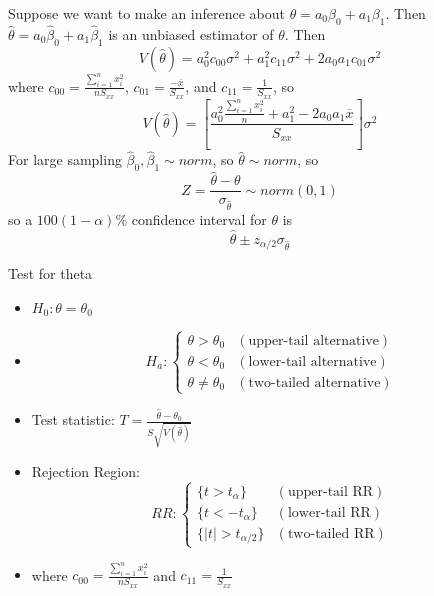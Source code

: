 \documentclass[12pt, a4paper, twoside, openright, titlepage]{book}
\begin{document}
Suppose we want to make an inference about $\theta = a_0\beta_0 + a_1\beta_1$. Then $\hat{\theta} = a_0\hat{\beta}_0 + a_1\hat{\beta}_1$ is an unbiased estimator of $\theta$. Then $$V(\hat{\theta}) = a_0^2c_{00}\sigma^2 + a_1^2c_{11}\sigma^2 + 2a_0a_1c_{01}\sigma^2$$
where $c_{00} = \frac{\sum_{i=1}^nx_i^2}{nS_{xx}}$, $c_{01} = \frac{-\overline{x}}{S_{xx}}$, and $c_{11} = \frac{1}{S_{xx}}$, so \begin{equation*}
    V(\hat{\theta}) = \left[\frac{a_0^2 \frac{\sum_{i=1}^nx_i^2}{n} + a_1^2 - 2a_0a_1\overline{x}}{S_{xx}}\right]\sigma^2
\end{equation*}
For large sampling $\hat{\beta}_0,\hat{\beta}_1 \sim norm$, so $\hat{\theta} \sim norm$, so \begin{equation*}
    Z = \frac{\hat{\theta} - \theta}{\sigma_{\hat{\theta}}} \sim norm(0,1)
\end{equation*}
so a $100(1-\alpha)\%$ confidence interval for $\theta$ is \begin{equation*}
    \hat{\theta}\pm z_{\alpha/2}\sigma_{\hat{\theta}}
\end{equation*}


\begin{rmk}{Test for theta}{}
    \leavevmode
    \begin{itemize}
        \item $H_0:\theta = \theta_0$
        \item \begin{equation*}
                H_a:\left\{\begin{array}{cc} \theta > \theta_0& (\text{upper-tail alternative}) \\ \theta < \theta_{0} & (\text{lower-tail alternative}) \\ \theta \neq \theta_{0} & (\text{two-tailed alternative}) \end{array}\right.
        \end{equation*}
    \item Test statistic: $T = \frac{\hat{\theta} - \theta_{0}}{S\sqrt{V(\hat{\theta})}}$
        \item Rejection Region: \begin{equation*}
                RR: \left\{\begin{array}{cc} \{t > t_{\alpha}\} & (\text{upper-tail RR}) \\ \{t < -t_{\alpha}\} & (\text{lower-tail RR}) \\ \{|t| > t_{\alpha/2}\} & (\text{two-tailed RR}) \end{array}\right.
        \end{equation*}
        \item where $c_{00} = \frac{\sum_{i=1}^nx_i^2}{nS_{xx}}$ and $c_{11} = \frac{1}{S_{xx}}$
    \end{itemize}
\end{rmk}
\end{document}

